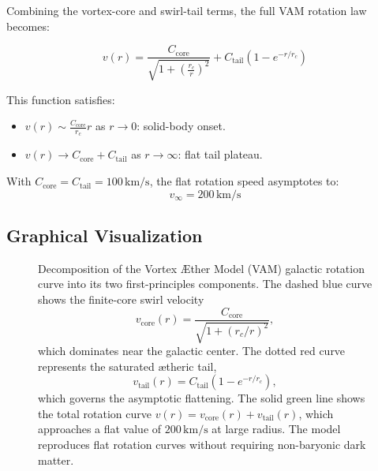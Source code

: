 \documentclass[12pt]{article}
\begin{document}
Combining the vortex-core and swirl-tail terms, the full VAM rotation law becomes:

\begin{equation}
    \boxed{
    v(r) = \frac{C_{\text{core}}}{\sqrt{1 + \left( \frac{r_c}{r} \right)^2}} + C_{\text{tail}} \left(1 - e^{-r/r_c} \right)
    }
    \label{eq:full_vam_profile}
\end{equation}

This function satisfies:
\begin{itemize}
    \item \( v(r) \sim \frac{C_{\text{core}}}{r_c} r \) as \( r \to 0 \): solid-body onset.
    \item \( v(r) \to C_{\text{core}} + C_{\text{tail}} \) as \( r \to \infty \): flat tail plateau.
\end{itemize}

With \( C_{\text{core}} = C_{\text{tail}} = 100\,\text{km/s} \), the flat rotation speed asymptotes to:
\[
v_\infty = 200\,\text{km/s}
\]

\subsection{Graphical Visualization}

\begin{figure}[H]
\centering
{}
\caption{
    Decomposition of the Vortex \AE{}ther Model (VAM) galactic rotation curve into its two first-principles components. The dashed blue curve shows the finite-core swirl velocity
    \[
        v_{\text{core}}(r) = \frac{C_{\text{core}}}{\sqrt{1 + (r_c/r)^2}},
    \]
    which dominates near the galactic center. The dotted red curve represents the saturated ætheric tail,
    \[
        v_{\text{tail}}(r) = C_{\text{tail}} (1 - e^{-r/r_c}),
    \]
    which governs the asymptotic flattening. The solid green line shows the total rotation curve \( v(r) = v_{\text{core}}(r) + v_{\text{tail}}(r) \), which approaches a flat value of \( 200\,\mathrm{km/s} \) at large radius. The model reproduces flat rotation curves without requiring non-baryonic dark matter.
}
\label{fig:vam_rotation_profile}
\end{figure}
\end{document}
